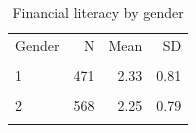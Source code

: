 \begin{table}[htbp]\centering\small
\caption{Financial literacy by gender}
\label{tab:finlit_by_gender}
\begin{tabular}{lrrr}\toprule
Gender & N & Mean & SD \\\\ \midrule
1 & 471 & 2.33 & 0.81 \\\\
2 & 568 & 2.25 & 0.79 \\\\
\bottomrule
\end{tabular}\end{table}
